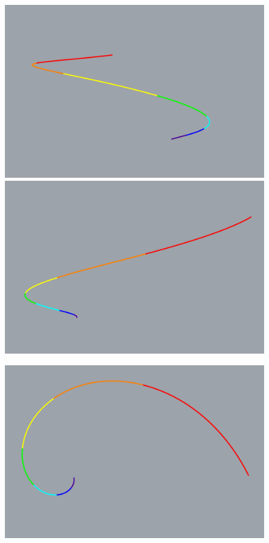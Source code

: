 \documentclass[utf8]{ctexart} %
\begin{document}
	 \begin{figure}[ht]
	 	\centering
	 	\label{seven color bezier}
	 	\begin{minipage}[b]{0.45\textwidth} %
	 		\centering
	 		\includegraphics[width=\textwidth]{figures/Seven_Color_Bezier.png}\\
	 		\includegraphics[width=\textwidth]{figures/Seven_Color_Bezier_Front.png}
	 	\end{minipage}\hfill
	 	\begin{minipage}[b]{0.45\textwidth} %
	 		\centering
	 		\includegraphics[width=\textwidth]{figures/Seven_Color_Bezier_Top.png}\\

\end{minipage}
\end{figure}
\end{document}

